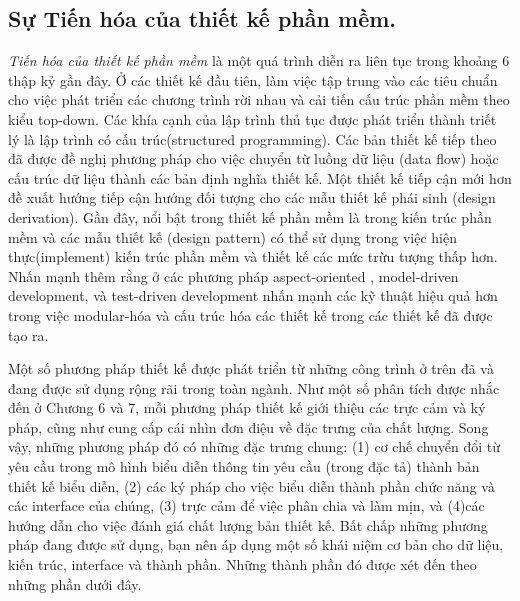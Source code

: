 \documentclass[./../SoftwareEngineering.tex]{subfiles}
\begin{document}
	\subsection{Sự Tiến hóa của thiết kế phần mềm.}
	\textit{Tiến hóa của thiết kế phần mềm} là một quá trình diễn ra liên tục trong khoảng 6 thập kỷ gần đây. Ở các thiết kế đầu tiên, làm việc tập trung vào các tiêu chuẩn cho việc phát triển các chương trình rời nhau và cải tiến cấu trúc phần mềm theo kiểu top-down. Các khía cạnh của lập trình thủ tục được phát triển thành triết lý là lập trình có cấu trúc(structured programming). Các bản thiết kế tiếp theo đã được đề nghị phương pháp cho việc chuyển từ luồng dữ liệu (data flow) hoặc cấu trúc dữ liệu thành các bản định nghĩa thiết kế. Một thiết kế tiếp cận mới hơn đề xuất hướng tiếp cận hướng đối tượng cho các mẫu thiết kế phái sinh (design derivation). Gần đây, nổi bật trong thiết kế phần mềm là trong kiến trúc phần mềm \cites{Kru06} và các mẫu thiết kế (design pattern) có thể sử dụng trong việc hiện thực(implement) kiến trúc phần mềm và thiết kế các mức trừu tượng thấp hơn. Nhấn mạnh thêm rằng ở các phương pháp aspect-oriented , model-driven development, và test-driven development nhấn mạnh các kỹ thuật hiệu quả hơn trong việc modular-hóa và cấu trúc hóa các thiết kế trong các thiết kế đã được tạo ra. 
	
	
	Một số phương pháp thiết kế được phát triển từ những công trình ở trên đã và đang được sử dụng rộng rãi trong toàn ngành. Như một số phân tích được nhắc đến ở Chương 6 và 7, mỗi phương pháp thiết kế giới thiệu các trực cảm và ký pháp, cũng như cung cấp cái nhìn đơn điệu về đặc trưng của chất lượng. Song vậy, những phương pháp đó có những đặc trưng chung: (1) cơ chế chuyển đổi từ yêu cầu trong mô hình biểu diễn thông tin yêu cầu (trong đặc tả) thành bản thiết kế biểu diễn, (2) các ký pháp cho việc biểu diễn thành phần chức năng và các interface của chúng, (3) trực cảm để việc phân chia và làm mịn, và (4)các hướng dẫn cho việc đánh giá chất lượng bản thiết kế.
	Bất chấp những phương pháp đang được sử dụng, bạn nên áp dụng một số khái niệm cơ bản cho dữ liệu, kiến trúc, interface và thành phần. Những thành phần đó được xét đến theo những phần dưới đây.
	
\end{document}
